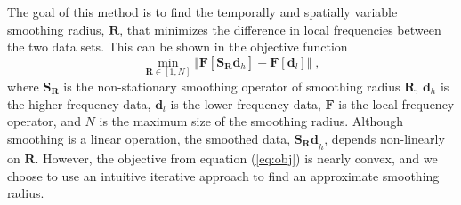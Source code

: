         The goal of this method is to find the temporally and spatially variable smoothing radius, $\mathbf{R}$, that minimizes the difference in local frequencies between the two data sets. 
        This can be shown in the objective function
        \begin{equation}
                \label{eq:obj}
                \min_{\mathbf{R} \in [1,N]} \Big \Vert \mathbf{F}[ \mathbf{S}_{\mathbf{R}} \mathbf{d}_h ] - 
                \mathbf{F}[ \mathbf{d}_l] \Big \Vert\;,
        \end{equation}
        where $\mathbf{S}_\mathbf{R}$ is the non-stationary smoothing operator of smoothing radius $\mathbf{R}$, $\mathbf{d}_h$ is the higher frequency data, $\mathbf{d}_l$ is the lower frequency data, $\mathbf{F}$ is the local frequency operator, and $N$ is the maximum size of the smoothing radius.
        Although smoothing is a linear operation, the smoothed data, $\mathbf{S_R d}_h$, depends non-linearly on $\mathbf{R}$. However, the objective from equation (\ref{eq:obj}) is nearly convex, and we choose to use an intuitive iterative approach to find an approximate smoothing radius.
                                
